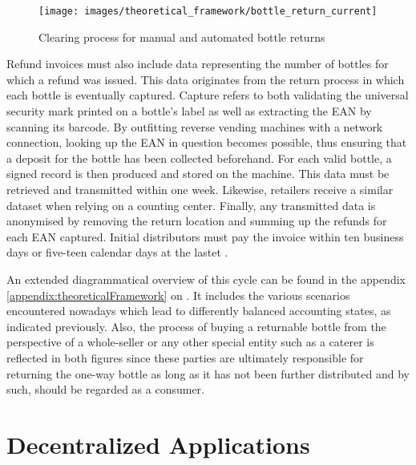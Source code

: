\begin{figure}[hbt]
	\centering
  	\texttt{[image: images/theoretical\_framework/bottle\_return\_current]}
  	\caption{Clearing process for manual and automated bottle returns \cite[p.~18]{Hartlep2011Recycling}}
  	\label{fig:clearingProcess}
\end{figure}

Refund invoices must also include data representing the number of bottles for which a refund was issued. This data originates from the return process in which each bottle is eventually captured. Capture refers to both validating the universal security mark printed on a bottle’s label as well as extracting the \ac{EAN} by scanning its barcode. By outfitting reverse vending machines with a network connection, looking up the \ac{EAN} in question becomes possible, thus ensuring that a deposit for the bottle has been collected beforehand. For each valid bottle, a signed record is then produced and stored on the machine. This data must be retrieved and transmitted within one week. Likewise, retailers receive a similar dataset when relying on a counting center. Finally, any transmitted data is anonymised by removing the return location and summing up the refunds for each \ac{EAN} captured. Initial distributors must pay the invoice within ten business days or five-teen calendar days at the lastet  \cite[p.~18-19]{Hartlep2011Recycling}.

An extended diagrammatical overview of this cycle can be found in the appendix \autoref{appendix:theoreticalFramework} on . It includes the various scenarios encountered nowadays which lead to differently balanced accounting states, as indicated previously. Also, the process of buying a returnable bottle from the perspective of a whole-seller or any other special entity such as a caterer is reflected in both figures since these parties are ultimately responsible for returning the one-way bottle as long as it has not been further distributed and by such, should be regarded as a consumer.


\pagebreak

\section{Decentralized Applications}

